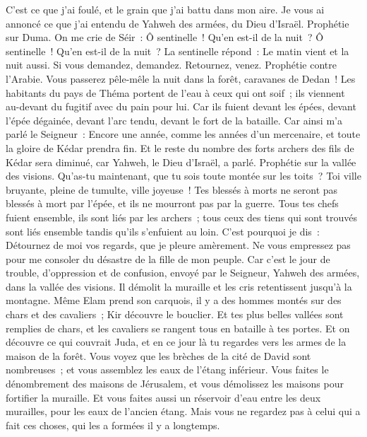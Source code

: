 \begin{multicols}{2}
C'est ce que j'ai foulé, et le grain que j'ai battu dans mon aire. Je vous ai annoncé ce que j'ai entendu de Yahweh des armées, du Dieu d'Israël.
Prophétie sur Duma. On me crie de Séir~: Ô sentinelle~! Qu'en est-il de la nuit~? Ô sentinelle~! Qu'en est-il de la nuit~?
La sentinelle répond~: Le matin vient et la nuit aussi. Si vous demandez, demandez. Retournez, venez.
Prophétie contre l'Arabie. Vous passerez pêle-mêle la nuit dans la forêt, caravanes de Dedan~!
Les habitants du pays de Théma portent de l'eau à ceux qui ont soif~; ils viennent au-devant du fugitif avec du pain pour lui.
Car ils fuient devant les épées, devant l'épée dégainée, devant l'arc tendu, devant le fort de la bataille.
Car ainsi m'a parlé le Seigneur~: Encore une année, comme les années d'un mercenaire, et toute la gloire de Kédar prendra fin.
Et le reste du nombre des forts archers des fils de Kédar sera diminué, car Yahweh, le Dieu d'Israël, a parlé.
\VerseOne{}Prophétie sur la vallée des visions. Qu'as-tu maintenant, que tu sois toute montée sur les toits~?
Toi ville bruyante, pleine de tumulte, ville joyeuse~! Tes blessés à morts ne seront pas blessés à mort par l'épée, et ils ne mourront pas par la guerre.
Tous tes chefs fuient ensemble, ils sont liés par les archers~; tous ceux des tiens qui sont trouvés sont liés ensemble tandis qu'ils s'enfuient au loin.
C'est pourquoi je dis~: Détournez de moi vos regards, que je pleure amèrement. Ne vous empressez pas pour me consoler du désastre de la fille de mon peuple.
Car c'est le jour de trouble, d'oppression et de confusion, envoyé par le Seigneur, Yahweh des armées, dans la vallée des visions. Il démolit la muraille et les cris retentissent jusqu'à la montagne.
Même Elam prend son carquois, il y a des hommes montés sur des chars et des cavaliers~; Kir découvre le bouclier.
Et tes plus belles vallées sont remplies de chars, et les cavaliers se rangent tous en bataille à tes portes.
Et on découvre ce qui couvrait Juda, et en ce jour là tu regardes vers les armes de la maison de la forêt.
Vous voyez que les brèches de la cité de David sont nombreuses~; et vous assemblez les eaux de l'étang inférieur.
Vous faites le dénombrement des maisons de Jérusalem, et vous démolissez les maisons pour fortifier la muraille.
Et vous faites aussi un réservoir d'eau entre les deux murailles, pour les eaux de l'ancien étang. Mais vous ne regardez pas à celui qui a fait ces choses, qui les a formées il y a longtemps.

\end{multicols}
